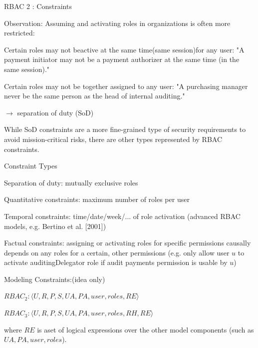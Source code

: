 \documentclass[a4paper]{article}
\begin{document}
\begin{multicols}{3}
    RBAC 2 : Constraints
    \begin{itemize*}
        \item Observation: Assuming and activating roles in organizations is often more restricted:
        \begin{itemize*}
            \item Certain roles may not beactive at the same time(same session)for any user: "A payment initiator may not be a payment authorizer at the same time (in the same session)."
            \item Certain roles may not be together assigned to any user: "A purchasing manager never be the same person as the head of internal auditing."
            \item $\rightarrow$ separation of duty (SoD)
            \item While SoD constraints are a more fine-grained type of security requirements to avoid mission-critical risks, there are other types represented by RBAC constraints.
        \end{itemize*}
        \item Constraint Types
        \begin{itemize*}
            \item Separation of duty: mutually exclusive roles
            \item Quantitative constraints: maximum number of roles per user
            \item Temporal constraints: time/date/week/... of role activation (advanced RBAC models, e.g. Bertino et al. [2001])
            \item Factual constraints: assigning or activating roles for specific permissions causally depends on any roles for a certain, other permissions (e.g. only allow user $u$ to activate auditingDelegator role if audit payments permission is usable by $u$)
        \end{itemize*}
        \item Modeling Constraints:(idea only)
        \begin{itemize*}
            \item $RBAC_2 : ⟨U,R,P,S,UA,PA,user,roles,RE⟩$
            \item $RBAC_3 : ⟨U,R,P,S,UA,PA,user,roles,RH,RE⟩$
            \item where $RE$ is aset of logical expressions over the other model components (such as $UA,PA,user,roles$).
        \end{itemize*}
    \end{itemize*}


\end{multicols}
\end{document}
